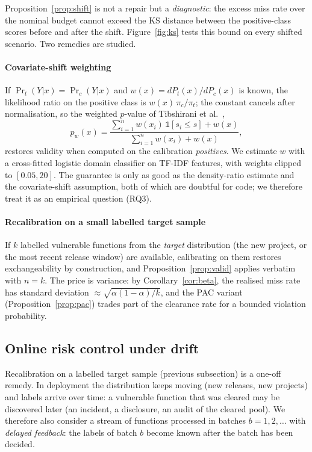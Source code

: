 Proposition~\ref{prop:shift} is not a repair but a \emph{diagnostic}: the excess miss rate over the nominal budget cannot exceed the KS distance between the positive-class scores before and after the shift. Figure~\ref{fig:ks} tests this bound on every shifted scenario.
Two remedies are studied.

\paragraph{Covariate-shift weighting}
If $\Pr_t(Y|x)=\Pr_c(Y|x)$ and $w(x)=dP_t(x)/dP_c(x)$ is known, the likelihood ratio on the positive class is $w(x)\,\pi_c/\pi_t$; the constant cancels after normalisation, so the weighted $p$-value of Tibshirani et al.~\cite{tibshirani2019conformal},
\begin{equation}
  p_w(x)=\frac{\sum_{i=1}^n w(x_i)\,\mathbb 1[s_i\le s]+w(x)}{\sum_{i=1}^n w(x_i)+w(x)},
\end{equation}
restores validity when computed on the calibration \emph{positives}. We estimate $w$ with a cross-fitted logistic domain classifier on TF-IDF features, with weights clipped to $[0.05,20]$. The guarantee is only as good as the density-ratio estimate and the covariate-shift assumption, both of which are doubtful for code; we therefore treat it as an empirical question (RQ3).

\paragraph{Recalibration on a small labelled target sample}
If $k$ labelled vulnerable functions from the \emph{target} distribution (the new project, or the most recent release window) are available, calibrating on them restores exchangeability by construction, and Proposition~\ref{prop:valid} applies verbatim with $n=k$. The price is variance: by Corollary~\ref{cor:beta}, the realised miss rate has standard deviation $\approx\sqrt{\alpha(1-\alpha)/k}$, and the PAC variant (Proposition~\ref{prop:pac}) trades part of the clearance rate for a bounded violation probability.

\subsection{Online risk control under drift}\label{sec:online}
Recalibration on a labelled target sample (previous subsection) is a one-off remedy. In deployment the distribution keeps moving (new releases, new projects) and labels arrive over time: a vulnerable function that was cleared may be discovered later (an incident, a disclosure, an audit of the cleared pool). We therefore also consider a stream of functions processed in batches $b=1,2,\dots$ with \emph{delayed feedback}: the labels of batch $b$ become known after the batch has been decided.

